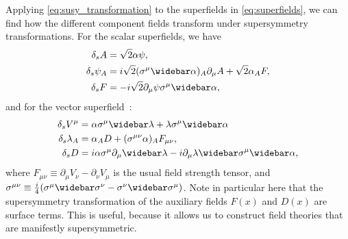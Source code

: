 Applying \cref{eq:susy_transformation} to the superfields in \cref{eq:superfields}, we can find how the different component fields transform under supersymmetry transformations.
For the scalar superfields, we have~\cite{Tong:susy}
\begin{subequations}
\label{eq:scalar_susy_transformations}
\begin{align}
    \delta_s A &= \sqrt{2} \alpha\psi,
    \\
    \delta_s \psi_A &= i\sqrt{2} (\sigma^\mu\widebar\alpha)_A \partial_\mu A + \sqrt{2}\alpha_A F,
    \\
    \delta_s F &= -i\sqrt{2}\partial_\mu\psi\sigma^\mu\widebar\alpha,
\end{align}
\end{subequations}
and for the vector superfield~\cite{Tong:susy}:
\begin{subequations}
\label{eq:vector_susy_transformations}
\begin{align}
    \delta_s V^\mu &= \alpha\sigma^\mu\widebar\lambda + \lambda\sigma^\mu\widebar\alpha
    \\
    \delta_s \lambda_A &= \alpha_A D + (\sigma^{\mu\nu}\alpha)_A F_{\mu\nu},
    \\
    \delta_s D &= i\alpha\sigma^\mu\partial_\mu\widebar\lambda - i\partial_\mu\lambda\widebar\sigma^\mu\widebar\alpha,
\end{align}
\end{subequations}
where $F_{\mu\nu} \equiv \partial_\mu V_\nu - \partial_\nu V_\mu$ is the usual field strength tensor, and $\sigma^{\mu\nu} \equiv \frac{i}{4}(\sigma^\mu\widebar\sigma^\nu - \sigma^\nu\widebar\sigma^\mu)$.
Note in particular here that the supersymmetry transformation of the auxiliary fields $F(x)$ and $D(x)$ are surface terms.
This is useful, because it allows us to construct field theories that are manifestly supersymmetric.

